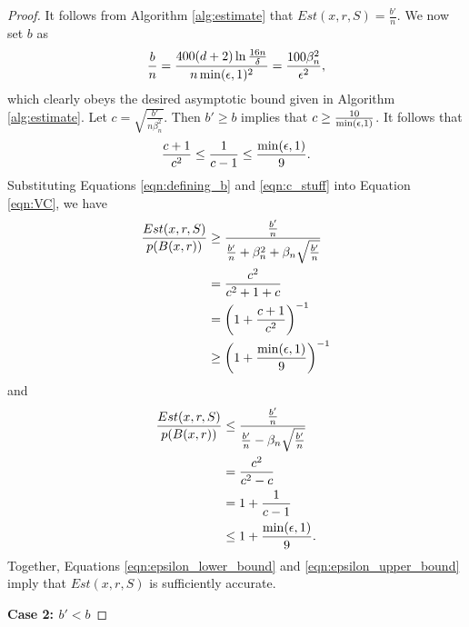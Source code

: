 \begin{proof}
It follows from Algorithm \ref{alg:estimate} that $Est(x, r, S) = \frac{b'}{n}$. We now set $b$ as  \begin{equation}\label{eqn:defining_b}\frac{b}{n} = \frac{400(d+2)\ln\frac{16n}{\delta}}{n\min(\epsilon, 1)^2} = \frac{100\beta_n^2}{\epsilon^2},\end{equation} which clearly obeys the desired asymptotic bound given in Algorithm \ref{alg:estimate}. Let $c = \sqrt{\frac{b'}{n\beta_n^2}}$. Then $b' \geq b$ implies that $c \geq \frac{10}{\min(\epsilon, 1)}$. It follows that \begin{equation}\label{eqn:c_stuff}\frac{c+1}{c^2} \leq \frac{1}{c-1} \leq \frac{\min(\epsilon, 1)}{9}.\end{equation} Substituting Equations \ref{eqn:defining_b} and \ref{eqn:c_stuff} into  Equation \ref{eqn:VC}, we have 
\begin{equation}\label{eqn:epsilon_lower_bound}
\begin{split}
\frac{Est(x, r, S)}{p(B(x, r))} &\geq \frac{\frac{b'}{n}}{\frac{b'}{n} + \beta_n^2 + \beta_n \sqrt{\frac{b'}{n}}} \\
&= \frac{c^2}{c^2 + 1 + c} \\
&= \left(1 + \frac{c+1}{c^2} \right)^{-1} \\
&\geq \left(1 + \frac{\min(\epsilon, 1)}{9}\right)^{-1}
\end{split}
\end{equation}
and 
\begin{equation}\label{eqn:epsilon_upper_bound}
\begin{split}
\begin{split}
\frac{Est(x, r, S)}{p(B(x, r))} &\leq \frac{\frac{b'}{n}}{\frac{b'}{n} - \beta_n \sqrt{\frac{b'}{n}}} \\
&= \frac{c^2}{c^2 - c} \\
&= 1 + \frac{1}{c-1} \\
&\leq 1 + \frac{\min(\epsilon, 1)}{9}.
\end{split}
\end{split}
\end{equation}
Together, Equations \ref{eqn:epsilon_lower_bound} and \ref{eqn:epsilon_upper_bound} imply that $Est(x, r, S)$ is sufficiently accurate. 


\textbf{Case 2: $b' < b$ }


\end{proof}
